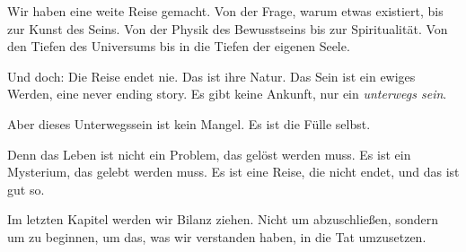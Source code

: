 Wir haben eine weite Reise gemacht. Von der Frage, warum etwas existiert, bis zur Kunst des Seins. Von der Physik des Bewusstseins bis zur Spiritualität. Von den Tiefen des Universums bis in die Tiefen der eigenen Seele.

Und doch: Die Reise endet nie. Das ist ihre Natur. Das Sein ist ein ewiges Werden, eine never ending story. Es gibt keine Ankunft, nur ein \emph{unterwegs sein}.

Aber dieses Unterwegssein ist kein Mangel. Es ist die Fülle selbst.

Denn das Leben ist nicht ein Problem, das gelöst werden muss. Es ist ein Mysterium, das gelebt werden muss. Es ist eine Reise, die nicht endet, und das ist gut so.

Im letzten Kapitel werden wir Bilanz ziehen. Nicht um abzuschließen, sondern um zu beginnen, um das, was wir verstanden haben, in die Tat umzusetzen.
